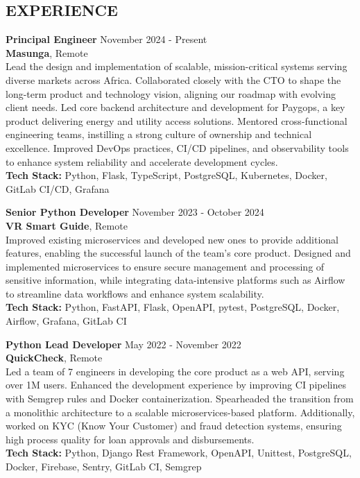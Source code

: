 \documentclass[margin, 10pt]{res} %
\begin{document}
\begin{resume}
    \section{EXPERIENCE}

    \textbf{Principal Engineer} \hfill November 2024 - Present\\
    \textbf{Masunga}, Remote\\
    Lead the design and implementation of scalable, mission-critical systems serving diverse markets across Africa. Collaborated closely with the CTO to shape the long-term product and technology vision, aligning our roadmap with evolving client needs. Led core backend architecture and development for Paygops, a key product delivering energy and utility access solutions. Mentored cross-functional engineering teams, instilling a strong culture of ownership and technical excellence. Improved DevOps practices, CI/CD pipelines, and observability tools to enhance system reliability and accelerate development cycles.\\
    \textbf{Tech Stack:} Python, Flask, TypeScript, PostgreSQL, Kubernetes, Docker, GitLab CI/CD, Grafana


    \textbf{Senior Python Developer} \hfill November 2023 - October 2024\\
    \textbf{VR Smart Guide}, Remote\\
    Improved existing microservices and developed new ones to provide additional features, enabling the successful launch of the team's core product. Designed and implemented microservices to ensure secure management and processing of sensitive information, while integrating data-intensive platforms such as Airflow to streamline data workflows and enhance system scalability.\\
    \textbf{Tech Stack:} Python, FastAPI, Flask, OpenAPI, pytest, PostgreSQL, Docker, Airflow, Grafana, GitLab CI

    \textbf{Python Lead Developer} \hfill May 2022 - November 2022\\
    \textbf{QuickCheck}, Remote\\
    Led a team of 7 engineers in developing the core product as a web API, serving over 1M users. Enhanced the development experience by improving CI pipelines with Semgrep rules and Docker containerization. Spearheaded the transition from a monolithic architecture to a scalable microservices-based platform. Additionally, worked on KYC (Know Your Customer) and fraud detection systems, ensuring high process quality for loan approvals and disbursements.\\
    \textbf{Tech Stack:} Python, Django Rest Framework, OpenAPI, Unittest, PostgreSQL, Docker, Firebase, Sentry, GitLab CI, Semgrep



\end{resume}
\end{document}
